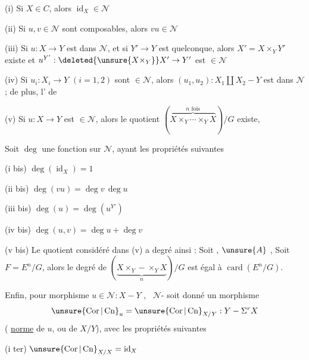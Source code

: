 (i) Si $X\in C$, alors $\operatorname{id}_X\in\mathcal{N}$

(ii) Si $u,v\in\mathcal{N}$ sont composables, alors $vu\in\mathcal{N}$

(iii) Si $u:X\longrightarrow Y$ est dans $\mathcal{N}$, et si $Y'\to Y$ est quelconque, alors $X'=X\times_Y Y'$ existe et $u^{Y'}:\deleted{\unsure{X\times_Y}}X'\to Y'$ est $\in\mathcal{N}$

(iv) Si $u_i:X_i\to Y$ $(i=1,2)$ sont $\in\mathcal{N}$, alors $(u_1,u_2):X_1\amalg X_2-Y$ est dans $\mathcal{N}$ ; de plus, l' de     

(v) Si $u:X\to Y$ est $\in\mathcal{N}$, alors  le quotient $(\overbrace{X\times_Y\cdots\times_Y X}^{n\text{ fois}})/G$ existe, 

Soit $\deg$ une fonction sur $\mathcal{N}$,  ayant les propriétés suivantes

(i bis) $\deg(\operatorname{id}_X)=1$

(ii bis) $\deg(vu)=\deg v\,\deg u$

(iii bis) $\deg(u)=\deg(u^{Y'})$

(iv bis) $\deg(u,v)=\deg u+\deg v$

(v bis) Le quotient considéré dans (v) a  degré   ainsi : Soit , $\unsure{A}$ ,
Soit $F=E^n/G$, alors  le degré de $(\underbrace{X\times_Y-\times_Y X}_{n})/G$ est égal à $\operatorname{card}(E^n/G)$.

Enfin, pour  morphisme $u\in\mathcal{N}:X-Y$ , \ $\mathcal{N}$- soit donné un morphisme
\[
\unsure{\operatorname{Cor}|\operatorname{Cn}}_u=\unsure{\operatorname{Cor}|\operatorname{Cn}}_{X/Y}:Y-\Sigma^r X
\]
(  \uline{norme} de $u$, ou de $X/Y$), avec les propriétés suivantes

(i ter) $\unsure{\operatorname{Cor}|\operatorname{Cn}}_{X/X}=\operatorname{id}_X$

